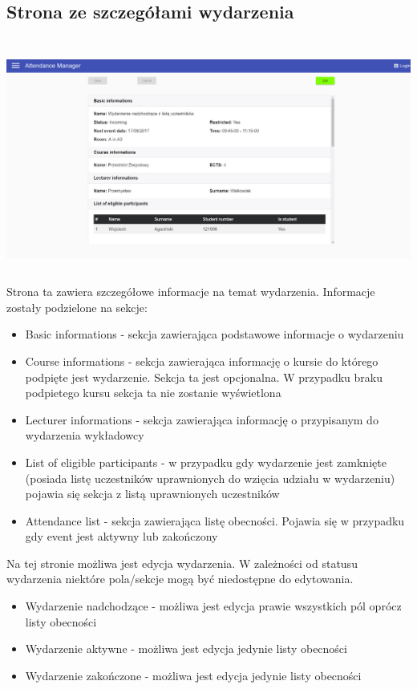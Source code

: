 \subsection{Strona ze szczegółami wydarzenia}
\includegraphics[height=8cm,width=15cm]{images/EventIncomingDetails}
Strona ta zawiera szczegółowe informacje na temat wydarzenia. Informacje zostały podzielone na sekcje:
\begin{itemize}
    \item Basic informations - sekcja zawierająca podstawowe informacje o wydarzeniu
    \item Course informations - sekcja zawierająca informację o kursie do którego podpięte jest wydarzenie. Sekcja ta jest opcjonalna. W przypadku braku podpietego kursu sekcja ta nie zostanie wyświetlona
    \item Lecturer informations - sekcja zawierająca informację o przypisanym do wydarzenia wykładowcy
    \item List of eligible participants - w przypadku gdy wydarzenie jest zamknięte (posiada listę uczestników uprawnionych do wzięcia udziału w wydarzeniu) pojawia się sekcja z listą uprawnionych uczestników
    \item Attendance list - sekcja zawierająca listę obecności. Pojawia się w przypadku gdy event jest aktywny lub zakończony
\end{itemize}
Na tej stronie możliwa jest edycja wydarzenia. W zależności od statusu wydarzenia niektóre pola/sekcje mogą być niedostępne do edytowania.
\begin{itemize}
    \item Wydarzenie nadchodzące - możliwa jest edycja prawie wszystkich pól oprócz listy obecności
    \item Wydarzenie aktywne - możliwa jest edycja jedynie listy obecności
    \item Wydarzenie zakończone - możliwa jest edycja jedynie listy obecności
\end{itemize}

